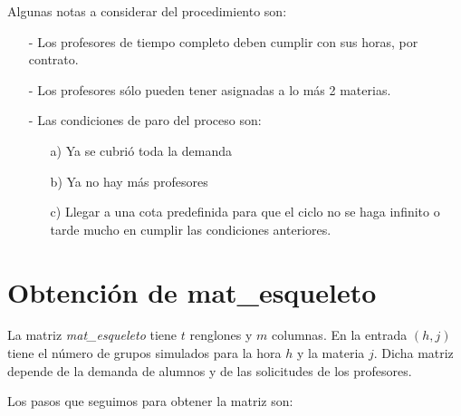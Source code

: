 Algunas notas a considerar del procedimiento son:
  
  \begin{itemize}

\item[-] Los profesores de tiempo completo deben cumplir con sus horas, por contrato.

\item[-] Los profesores sólo pueden tener asignadas a lo más 2 materias.

\item[-] Las condiciones de paro del proceso son:
  
  \begin{itemize}
\item[a)] Ya se cubrió toda la demanda

\item[b)] Ya no hay más profesores

\item[c)] Llegar a una cota predefinida para que el ciclo no se haga infinito o tarde mucho en cumplir las condiciones anteriores.
\end{itemize}
\end{itemize}


\section{Obtención de mat\_esqueleto} \label{sec_esqueletos}

La matriz \textit{mat\_esqueleto} tiene $t$ renglones y $m$ columnas. En la entrada $(h,j)$ tiene el número de grupos simulados para la hora $h$ y la materia $j$. Dicha matriz depende de la demanda de alumnos y de las solicitudes de los profesores.


Los pasos que seguimos para obtener la matriz son:

